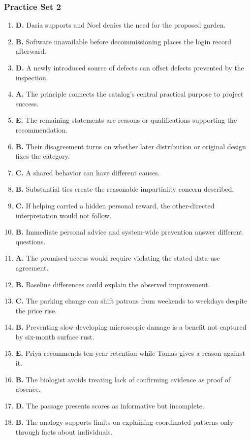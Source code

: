 \subsubsection*{Practice Set 2}
\begin{enumerate}
\item \textbf{D.} Daria supports and Noel denies the need for the proposed garden.
\item \textbf{B.} Software unavailable before decommissioning places the login record afterward.
\item \textbf{D.} A newly introduced source of defects can offset defects prevented by the inspection.
\item \textbf{A.} The principle connects the catalog's central practical purpose to project success.
\item \textbf{E.} The remaining statements are reasons or qualifications supporting the recommendation.
\item \textbf{B.} Their disagreement turns on whether later distribution or original design fixes the category.
\item \textbf{C.} A shared behavior can have different causes.
\item \textbf{B.} Substantial ties create the reasonable impartiality concern described.
\item \textbf{C.} If helping carried a hidden personal reward, the other-directed interpretation would not follow.
\item \textbf{B.} Immediate personal advice and system-wide prevention answer different questions.
\item \textbf{A.} The promised access would require violating the stated data-use agreement.
\item \textbf{B.} Baseline differences could explain the observed improvement.
\item \textbf{C.} The parking change can shift patrons from weekends to weekdays despite the price rise.
\item \textbf{B.} Preventing slow-developing microscopic damage is a benefit not captured by six-month surface rust.
\item \textbf{E.} Priya recommends ten-year retention while Tomas gives a reason against it.
\item \textbf{B.} The biologist avoids treating lack of confirming evidence as proof of absence.
\item \textbf{D.} The passage presents scores as informative but incomplete.
\item \textbf{B.} The analogy supports limits on explaining coordinated patterns only through facts about individuals.

\end{enumerate}
